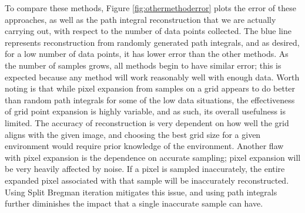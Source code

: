 \documentclass[english]{article}\usepackage[]{graphicx}\usepackage[]{color}
\begin{document}
To compare these methods, Figure \ref{fig:othermethoderror} plots the error of these approaches, as well as the path integral reconstruction that we are actually carrying out, with respect to the number of data points collected. The blue line represents reconstruction from randomly generated path integrals, and as desired, for a low number of data points, it has lower error than the other methods. As the number of samples grows, all methods begin to have similar error; this is expected because any method will work reasonably well with enough data. Worth noting is that while pixel expansion from samples on a grid appears to do better than random path integrals for some of the low data situations, the effectiveness of grid point expansion is highly variable, and as such, its overall usefulness is limited. The accuracy of reconstruction is very dependent on how well the grid aligns with the given image, and choosing the best grid size for a given environment would require prior knowledge of the environment. Another flaw with pixel expansion is the dependence on accurate sampling; pixel expansion will be very heavily affected by noise. If a pixel is sampled inaccurately, the entire expanded pixel associated with that sample will be inaccurately reconstructed. Using Split Bregman iteration mitigates this issue, and using path integrals further diminishes the impact that a single inaccurate sample can have.
\end{document}
